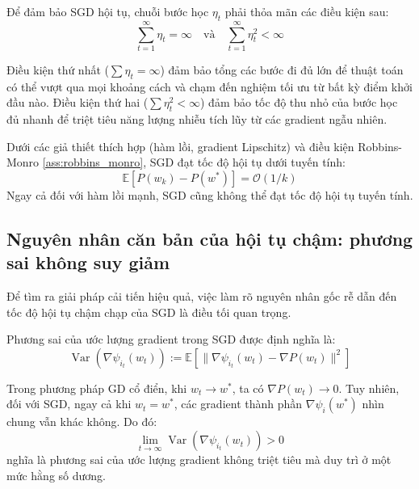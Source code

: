 \begin{assumption}
\label{ass:robbins_monro}
Để đảm bảo SGD hội tụ, chuỗi bước học $\eta_t$ phải thỏa mãn các điều kiện sau:
\begin{equation}
\sum_{t=1}^\infty \eta_t = \infty \quad \text{và} \quad \sum_{t=1}^\infty \eta_t^2 < \infty
\end{equation}
\end{assumption}

Điều kiện thứ nhất ($\sum \eta_t = \infty$) đảm bảo tổng các bước đi đủ lớn để thuật toán có thể vượt qua mọi khoảng cách và chạm đến nghiệm tối ưu từ bất kỳ điểm khởi đầu nào. Điều kiện thứ hai ($\sum \eta_t^2 < \infty$) đảm bảo tốc độ thu nhỏ của bước học đủ nhanh để triệt tiêu năng lượng nhiễu tích lũy từ các gradient ngẫu nhiên.

\begin{theorem}
\label{thm:sgd_sublinear}
Dưới các giả thiết thích hợp (hàm lồi, gradient Lipschitz) và điều kiện Robbins-Monro \ref{ass:robbins_monro}, SGD đạt tốc độ hội tụ dưới tuyến tính:
\begin{equation}
\mathbb{E}[P(w_k) - P(w^*)] = \mathcal{O}(1/k)
\end{equation}
Ngay cả đối với hàm lồi mạnh, SGD cũng không thể đạt tốc độ hội tụ tuyến tính.
\end{theorem}

\subsection{Nguyên nhân căn bản của hội tụ chậm: phương sai không suy giảm}

Để tìm ra giải pháp cải tiến hiệu quả, việc làm rõ nguyên nhân gốc rễ dẫn đến tốc độ hội tụ chậm chạp của SGD là điều tối quan trọng.

\begin{definition}
\label{def:gradient_variance}
Phương sai của ước lượng gradient trong SGD được định nghĩa là:
\begin{equation}
\operatorname{Var}(\nabla \psi_{i_t}(w_t)) := \mathbb{E} \left[ \|\nabla \psi_{i_t}(w_t) - \nabla P(w_t)\|^2 \right]
\end{equation}
\end{definition}

\begin{proposition}
\label{prop:variance_not_zero}
Trong phương pháp GD cổ điển, khi $w_t \to w^*$, ta có $\nabla P(w_t) \to 0$. Tuy nhiên, đối với SGD, ngay cả khi $w_t = w^*$, các gradient thành phần $\nabla \psi_i(w^*)$ nhìn chung vẫn khác không. Do đó:
\begin{equation}
\lim_{t \to \infty} \operatorname{Var}(\nabla \psi_{i_t}(w_t)) > 0
\end{equation}
nghĩa là phương sai của ước lượng gradient không triệt tiêu mà duy trì ở một mức hằng số dương.
\end{proposition}

